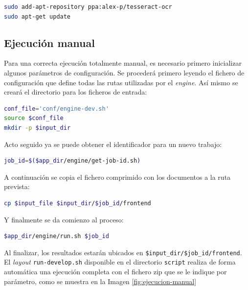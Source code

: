 \begin{lstlisting}[language=bash,caption={Activar PPA de Tesseract},label=lst:activar-ppa-tesseract]
sudo add-apt-repository ppa:alex-p/tesseract-ocr
sudo apt-get update
\end{lstlisting}

\subsection{Ejecución manual}

Para una correcta ejecución totalmente manual, es necesario primero inicializar algunos parámetros de configuración. Se procederá primero leyendo el fichero de configuración que define todas las rutas utilizadas por el \emph{engine}. Así mismo se creará el directorio para los ficheros de entrada:

\begin{lstlisting}[language=bash,caption={},label={}]
conf_file='conf/engine-dev.sh'
source $conf_file
mkdir -p $input_dir
\end{lstlisting}

Acto seguido ya se puede obtener el identificador para un nuevo trabajo:

\begin{lstlisting}[language=bash,caption={},label={}]
job_id=$($app_dir/engine/get-job-id.sh)
\end{lstlisting}

A continuación se copia el fichero comprimido con los documentos a la ruta prevista:

\begin{lstlisting}[language=bash,caption={},label={}]
cp $input_file $input_dir/$job_id/frontend
\end{lstlisting}

Y finalmente se da comienzo al proceso:

\begin{lstlisting}[language=bash,caption={},label={}]
$app_dir/engine/run.sh $job_id
\end{lstlisting}

Al finalizar, los resultados estarán ubicados en \verb|$input_dir/$job_id/frontend|. El \emph{layout} \verb|run-develop.sh| disponible en el directorio \verb|script| realiza de forma automática una ejecución completa con el fichero zip que se le indique por parámetro, como se muestra en la Imagen \ref{fig:ejecucion-manual}

